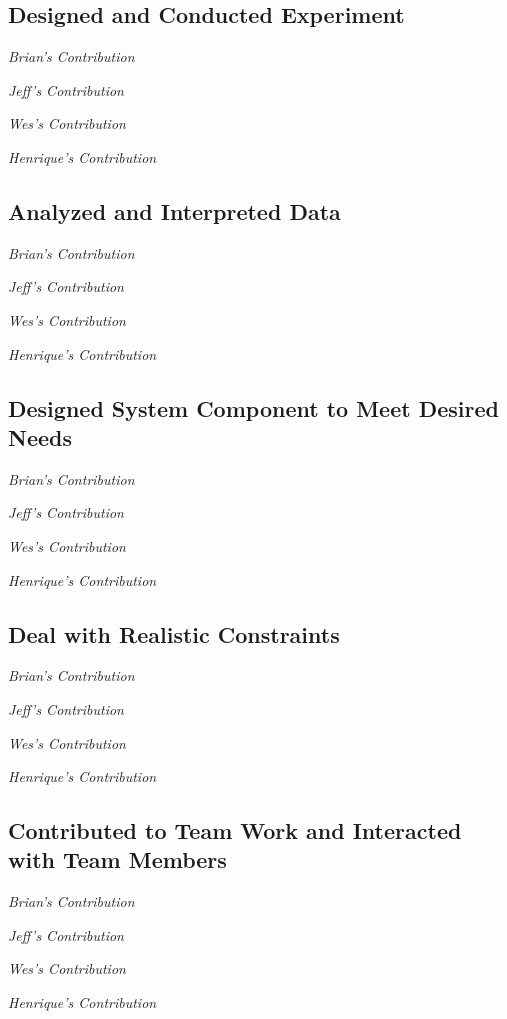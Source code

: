 \documentclass[11pt]{article}
\begin{document}
\subsection{Designed and Conducted Experiment}

\textit{Brian's Contribution}


\textit{Jeff's Contribution}


\textit{Wes's Contribution}


\textit{Henrique's Contribution}


\subsection{Analyzed and Interpreted Data}

\textit{Brian's Contribution}

\textit{Jeff's Contribution}


\textit{Wes's Contribution}

\textit{Henrique's Contribution}


\subsection{Designed System Component to Meet Desired Needs}

\textit{Brian's Contribution}


\textit{Jeff's Contribution}



\textit{Wes's Contribution}


\textit{Henrique's Contribution}


\subsection{Deal with Realistic Constraints}

\textit{Brian's Contribution}


\textit{Jeff's Contribution}


\textit{Wes's Contribution}
 

\textit{Henrique's Contribution}

\subsection{Contributed to Team Work and Interacted with Team Members}

\textit{Brian's Contribution}


\textit{Jeff's Contribution}


\textit{Wes's Contribution}

\textit{Henrique's Contribution}
\end{document}
